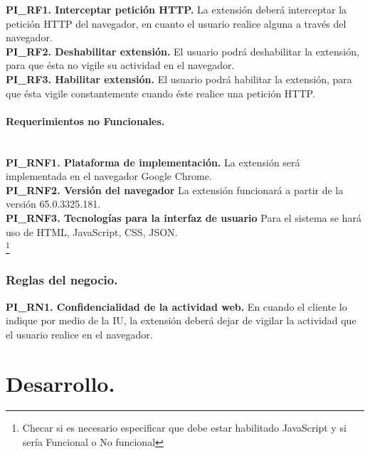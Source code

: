 \documentclass[12pt, a4paper, titlepage]{article}
\begin{document}
				{\setlength{\parindent}{12pt}
				\textbf{PI\_RF1. Interceptar petición HTTP.} La extensión deberá interceptar la petición HTTP del navegador, en cuanto el usuario realice alguna a través del navegador.\\

				\textbf{PI\_RF2. Deshabilitar extensión.} El usuario podrá deshabilitar la extensión, para que ésta no vigile su actividad en el navegador.\\
				
				\textbf{PI\_RF3. Habilitar extensión.} El usuario podrá habilitar la extensión, para que ésta vigile constantemente cuando éste realice una petición HTTP.
				}
				
				\paragraph{Requerimientos no Funcionales.\\ \\}
				{\setlength{\parindent}{12pt}
				
				\textbf{PI\_RNF1. Plataforma de implementación.} La extensión será implementada en el navegador Google Chrome.\\
				
				\textbf{PI\_RNF2. Versión del navegador} La extensión funcionará a partir de la versión 65.0.3325.181.\\
				
				\textbf{PI\_RNF3. Tecnologías para la interfaz de usuario} Para el sistema se hará uso de HTML, JavaScript, CSS, JSON.\\
				\footnote{Checar si es necesario especificar que debe estar habilitado JavaScript y si sería Funcional o No funcional}
				
				}\newpage
			
			\subsubsection{Reglas del negocio.\\}
				{\setlength{\parindent}{12pt}
					
					\textbf{PI\_RN1. Confidencialidad de la actividad web.} En cuando el cliente lo indique por medio de la IU, la extensión deberá dejar de vigilar la actividad que el usuario realice en el navegador.\\
					
				}\newpage
	\newpage
	\section{\textcolor{azulescom}{Desarrollo.}}
\end{document}
